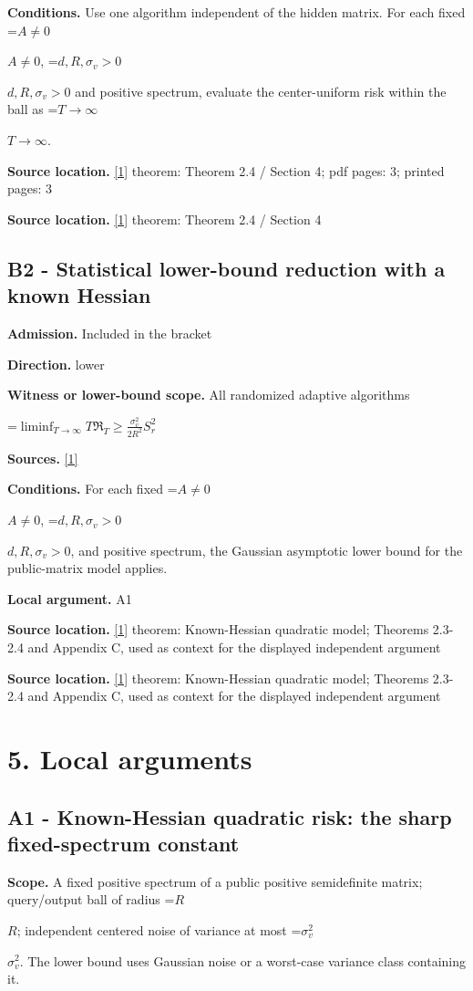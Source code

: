 \documentclass[10pt,a4paper]{article}
\newcommand{\AtlasMath}[1]{\par\begingroup\centering\setbox0=\hbox{$\displaystyle #1$}\ifdim\wd0>1.4\linewidth\typeout{ATLAS WIDE FORMULA: \the\wd0}\fi\ifdim\wd0>\linewidth\resizebox{\linewidth}{!}{\box0}\else\box0\fi\par\endgroup}
\newcommand{\AtlasInlineMath}[1]{\begingroup\setbox0=\hbox{$#1$}\ifdim\wd0>.4\linewidth\endgroup\AtlasMath{#1}\else\endgroup$#1$\fi}
\begin{document}
\textbf{Conditions.} Use one algorithm independent of the hidden matrix. For each fixed \AtlasInlineMath{A\ne0}, \AtlasInlineMath{d,R,\sigma_v>0} and positive spectrum, evaluate the center-uniform risk within the ball as \AtlasInlineMath{T\to\infty}.

\textbf{Source location.} \href{https://proceedings.neurips.cc/paper_files/paper/2023/file/6e60a9023d2c63f7f0856910129ae753-Paper-Conference.pdf}{[1]} theorem: Theorem 2.4 / Section 4; pdf pages: 3; printed pages: 3

\textbf{Source location.} \href{https://proceedings.neurips.cc/paper_files/paper/2023/file/6e60a9023d2c63f7f0856910129ae753-Paper-Conference.pdf}{[1]} theorem: Theorem 2.4 / Section 4

\subsection{B2 - Statistical lower-bound reduction with a known Hessian}
\textbf{Admission.} Included in the bracket

\textbf{Direction.} lower

\textbf{Witness or lower-bound scope.} All randomized adaptive algorithms

\AtlasMath{\liminf_{T\to\infty}T\mathfrak R_T\ge\frac{\sigma_v^2}{2R^2}S_r^2}
\textbf{Sources.} \href{https://proceedings.neurips.cc/paper_files/paper/2023/file/6e60a9023d2c63f7f0856910129ae753-Paper-Conference.pdf}{[1]}

\textbf{Conditions.} For each fixed \AtlasInlineMath{A\ne0}, \AtlasInlineMath{d,R,\sigma_v>0}, and positive spectrum, the Gaussian asymptotic lower bound for the public-matrix model applies.

\textbf{Local argument.} A1

\textbf{Source location.} \href{https://proceedings.neurips.cc/paper_files/paper/2023/file/6e60a9023d2c63f7f0856910129ae753-Paper-Conference.pdf}{[1]} theorem: Known-Hessian quadratic model; Theorems 2.3-2.4 and Appendix C, used as context for the displayed independent argument

\textbf{Source location.} \href{https://proceedings.neurips.cc/paper_files/paper/2023/file/6e60a9023d2c63f7f0856910129ae753-Paper-Conference.pdf}{[1]} theorem: Known-Hessian quadratic model; Theorems 2.3-2.4 and Appendix C, used as context for the displayed independent argument

\section{5. Local arguments}
\subsection{A1 - Known-Hessian quadratic risk: the sharp fixed-spectrum constant}
\textbf{Scope.} A fixed positive spectrum of a public positive semidefinite matrix; query/output ball of radius \AtlasInlineMath{R}; independent centered noise of variance at most \AtlasInlineMath{\sigma_v^2}. The lower bound uses Gaussian noise or a worst-case variance class containing it.
\end{document}

